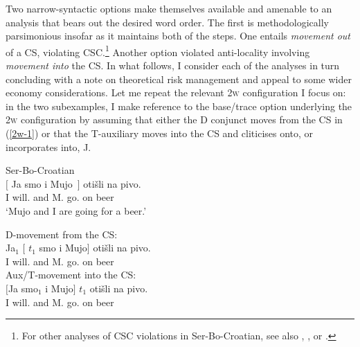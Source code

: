 \documentclass[output=paper]{langsci/langscibook}
\begin{document}
Two narrow-syntactic options make themselves available and amenable to an
analysis that bears out the desired word order. The first is methodologically
parsimonious insofar as it maintains both of the  steps. One
entails \emph{movement out} of a CS, violating 
\gls{CSC}.\footnote{For other analyses of CSC violations in
Ser-Bo-Croatian, see also \citet{Stjepanovic:2014},
\citet{Oda:2017}, or \citet{Boskovic2017}.} Another option violated
anti-locality involving  \emph{movement into} the CS. In what
follows, I consider each of the analyses in turn concluding with a note on
theoretical risk management and appeal to some wider economy considerations.
Let me repeat the relevant \textsc{2w} configuration I focus on: in the two
subexamples, I make reference to the base/trace option underlying the
\textsc{2w} configuration by assuming that either the D conjunct moves
from the CS in (\ref{2w-1}) or that the T-auxiliary moves into the CS and
cliticises onto, or incorporates into, J.

\begin{exe}
    \ex Ser-Bo-Croatian\\
    \gll $\big[$ Ja smo i Mujo~$\big]$  otišli na pivo.\\
        {} I will.\Pl{} and M. go.\Ptcp{} on beer \\
	\trans `Mujo and I are going for a beer.'
\begin{xlista}
\ex D-movement from the \gls{CS}:\\
\gll Ja$_1$ $\big[$ $t_1$ smo i Mujo$\big]$  otišli na pivo.\\
    I {} {} will.\Pl{} and M. go.\Ptcp{} on beer \\
\label{2w-1}
\ex Aux/T-movement into the \gls{CS}:\\
 \gll $\big[$Ja smo$_1$ i Mujo$\big]$  $t_1$ otišli na pivo.\\
     \hphantom{$\big[$}I will.\Pl{} and M. {} go.\Ptcp{} on beer \\
\label{2w-2}
\end{xlista}

\end{exe}
\end{document}
